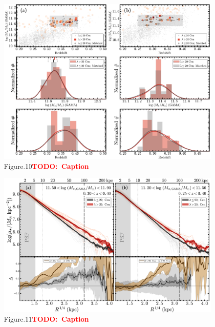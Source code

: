 \documentclass[preprint]{aastex}
\newcommand{\todo}[1]{\textcolor{red}{\textbf{TODO:~#1}}}
\begin{document}
\begin{CJK*}{UTF8}{gbsn}
\clearpage
{}
\begin{figure}
    \centering 
    \includegraphics[width=16.0cm]{fig/redbcg_prof_gama_1}
    \caption{Figure.10\todo{Caption}}\label{figure:10}
\end{figure}

\clearpage
{}
\begin{figure}
    \centering 
    \includegraphics[width=18.0cm]{fig/redbcg_prof_gama_2}
    \caption{Figure.11\todo{Caption}}\label{figure:11}
\end{figure}


\end{CJK*}
\end{document}
